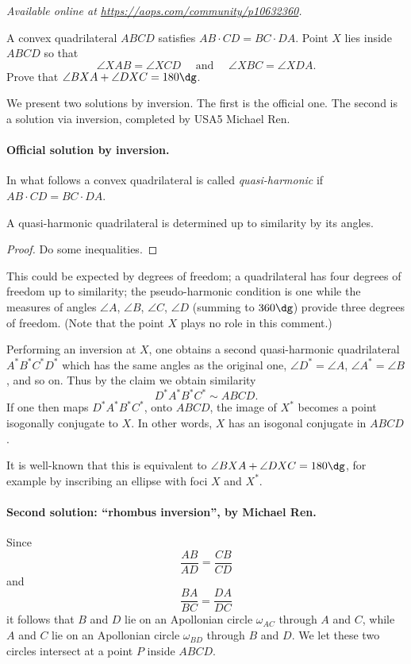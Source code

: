 
\textsl{Available online at \url{https://aops.com/community/p10632360}.}
\begin{mdframed}[style=mdpurplebox,frametitle={Problem statement}]
A convex quadrilateral $ABCD$ satisfies $AB \cdot CD = BC \cdot DA$.
Point $X$ lies inside $ABCD$ so that
\[ \angle XAB=\angle XCD \quad \text{ and } \quad \angle XBC=\angle XDA. \]
Prove that $\angle BXA + \angle DXC=180\dg$.
\end{mdframed}
We present two solutions by inversion.
The first is the official one.
The second is a solution via inversion, completed by USA5 Michael Ren.

\paragraph{Official solution by inversion.}
In what follows a convex quadrilateral is called
\emph{quasi-harmonic} if $AB \cdot CD = BC \cdot DA$.

\begin{claim*}
  A quasi-harmonic quadrilateral is determined
  up to similarity by its angles.
\end{claim*}
\begin{proof}
  Do some inequalities.
\end{proof}
\begin{remark*}
  This could be expected by degrees of freedom;
  a quadrilateral has four degrees of freedom up to similarity;
  the pseudo-harmonic condition is one
  while the measures of angles $\angle A$, $\angle B$, $\angle C$, $\angle D$
  (summing to $360\dg$) provide three degrees of freedom.
  (Note that the point $X$ plays no role in this comment.)
\end{remark*}

Performing an inversion at $X$, one obtains a
second quasi-harmonic quadrilateral
$A^\ast B^\ast C^\ast D^\ast$ which has the same angles
as the original one, $\angle D^\ast = \angle A$,
$\angle A^\ast = \angle B$, and so on.
Thus by the claim we obtain similarity
\[ D^\ast A^\ast B^\ast C^\ast \sim ABCD. \]
If one then maps $D^\ast A^\ast B^\ast C^\ast$,
onto $ABCD$, the image of $X^\ast$
becomes a point isogonally conjugate to $X$.
In other words, $X$ has an isogonal conjugate in $ABCD$.

It is well-known that this is equivalent to
$\angle BXA + \angle DXC = 180\dg$,
for example by inscribing an ellipse with foci $X$ and $X^\ast$.

\paragraph{Second solution: ``rhombus inversion'', by Michael Ren.}
Since
\[ \frac{AB}{AD} = \frac{CB}{CD} \]
and
\[ \frac{BA}{BC} = \frac{DA}{DC} \]
it follows that $B$ and $D$ lie on an Apollonian circle $\omega_{AC}$
through $A$ and $C$,
while $A$ and $C$ lie on an Apollonian circle $\omega_{BD}$
through $B$ and $D$.
We let these two circles intersect at a point $P$ inside $ABCD$.

